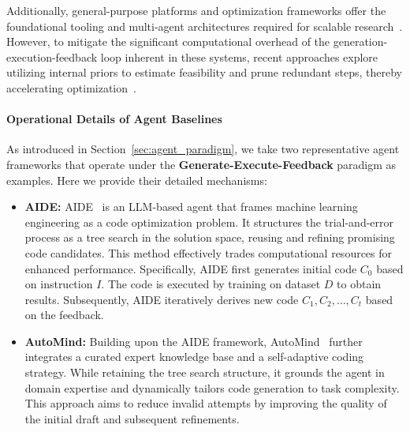 Additionally, general-purpose platforms and optimization frameworks offer the foundational tooling and multi-agent architectures required for scalable research~\cite{wang2025openhandsopenplatformai, jiang2025aideaidrivenexplorationspace, hong2024datainterpreterllmagent, qiang2025mledojointeractiveenvironmentsempowering, wang2025configurablemultiagentframeworkscalable}.
However, to mitigate the significant computational overhead of the generation-execution-feedback loop inherent in these systems, recent approaches explore utilizing internal priors to estimate feasibility and prune redundant steps, thereby accelerating optimization~\cite{kulibaba2025kompeteaiacceleratedautonomousmultiagent, trirat2025automlagentmultiagentllmframework, Zhang2024, Astorga2024}.


\paragraph{Operational Details of Agent Baselines}

As introduced in Section~\ref{sec:agent_paradigm}, we take two representative agent frameworks that operate under the \textbf{Generate-Execute-Feedback} paradigm as examples. Here we provide their detailed mechanisms:

\begin{itemize}
    \item \textbf{AIDE:} AIDE~\citep{jiang2025aideaidrivenexplorationspace} is an LLM-based agent that frames machine learning engineering as a code optimization problem.
    It structures the trial-and-error process as a tree search in the solution space, reusing and refining promising code candidates.
    This method effectively trades computational resources for enhanced performance.
    Specifically, AIDE first generates initial code $C_0$ based on instruction $I$.
    The code is executed by training on dataset $D$ to obtain results. Subsequently, AIDE iteratively derives new code $C_1, C_2, \dots, C_t$ based on the feedback.

    \item \textbf{AutoMind:} Building upon the AIDE framework, AutoMind~\citep{ou2025automindadaptiveknowledgeableagent} further integrates a curated expert knowledge base and a self-adaptive coding strategy.
    While retaining the tree search structure, it grounds the agent in domain expertise and dynamically tailors code generation to task complexity.
    This approach aims to reduce invalid attempts by improving the quality of the initial draft and subsequent refinements.
\end{itemize}


